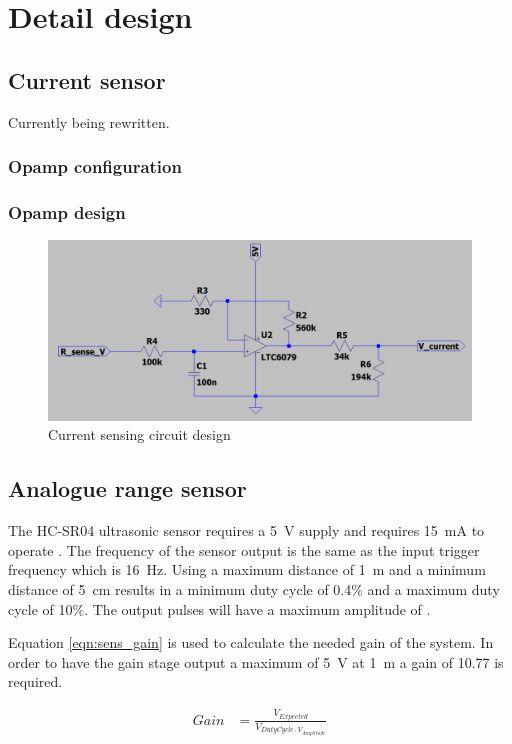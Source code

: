 \chapter{Detail design}\label{ch:detail_design}
\section{Current sensor}\label{sec:current_sensor_design}
Currently being rewritten.
\subsection{Opamp configuration}\label{sec:config}


\subsection{Opamp design}
\begin{figure}
\centering
\includegraphics[width=0.65\linewidth]{./Figures/CurSens_SimCir.png}
\caption{Current sensing circuit design}
\label{fig:cursen_sim_cir}
\end{figure}

\newpage
\section{Analogue range sensor}
The HC-SR04 ultrasonic sensor requires a \SI{5}{\volt} supply and requires \SI{15}{\milli\ampere} to operate \cite{Design_SonicSens}. The frequency of the sensor output is the same as the input trigger frequency which is \SI{16}{\hertz}. Using a maximum distance of \SI{1}{\meter} and a minimum distance of \SI{5}{\centi\meter} results in a minimum duty cycle of 0.4\% and a maximum duty cycle of 10\%. The output pulses will have a maximum amplitude of  \cite{Design_SonicSens}.

Equation \ref{eqn:sens_gain} is used to calculate the needed gain of the system. In order to have the gain stage output a maximum of \SI{5}{\volt} at \SI{1}{\meter} a gain of 10.77 is required.

\begin{align}
Gain &= \frac{V_{Expected}}{V_{Duty Cycle \cdot V_{Amplitude}}}\label{eqn:sens_gain}
\end{align}

